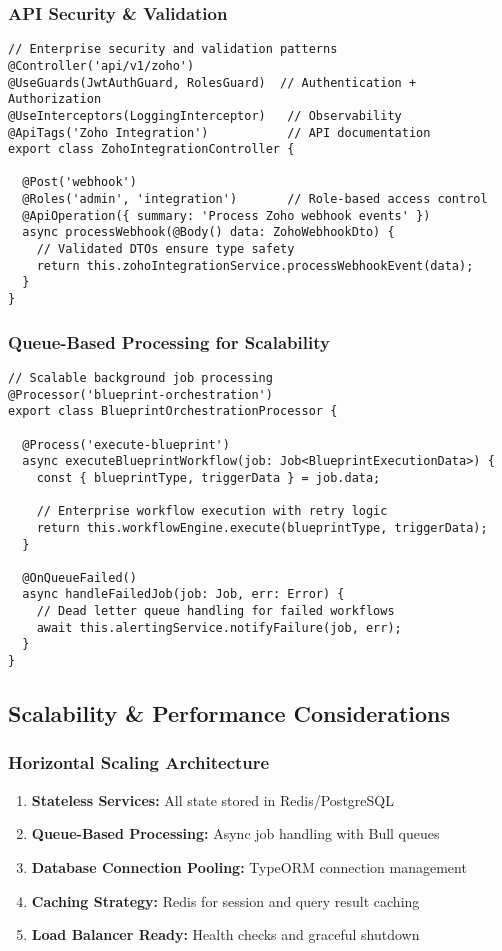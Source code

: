\subsubsection{API Security \& Validation}
\begin{verbatim}
// Enterprise security and validation patterns
@Controller('api/v1/zoho')
@UseGuards(JwtAuthGuard, RolesGuard)  // Authentication + Authorization
@UseInterceptors(LoggingInterceptor)   // Observability
@ApiTags('Zoho Integration')           // API documentation
export class ZohoIntegrationController {
  
  @Post('webhook')
  @Roles('admin', 'integration')       // Role-based access control
  @ApiOperation({ summary: 'Process Zoho webhook events' })
  async processWebhook(@Body() data: ZohoWebhookDto) {
    // Validated DTOs ensure type safety
    return this.zohoIntegrationService.processWebhookEvent(data);
  }
}
\end{verbatim}

\subsubsection{Queue-Based Processing for Scalability}
\begin{verbatim}
// Scalable background job processing
@Processor('blueprint-orchestration')
export class BlueprintOrchestrationProcessor {
  
  @Process('execute-blueprint')
  async executeBlueprintWorkflow(job: Job<BlueprintExecutionData>) {
    const { blueprintType, triggerData } = job.data;
    
    // Enterprise workflow execution with retry logic
    return this.workflowEngine.execute(blueprintType, triggerData);
  }
  
  @OnQueueFailed()
  async handleFailedJob(job: Job, err: Error) {
    // Dead letter queue handling for failed workflows
    await this.alertingService.notifyFailure(job, err);
  }
}
\end{verbatim}

\subsection{Scalability \& Performance Considerations}

\subsubsection{Horizontal Scaling Architecture}
\begin{enumerate}
\item \textbf{Stateless Services:} All state stored in Redis/PostgreSQL
\item \textbf{Queue-Based Processing:} Async job handling with Bull queues
\item \textbf{Database Connection Pooling:} TypeORM connection management
\item \textbf{Caching Strategy:} Redis for session and query result caching
\item \textbf{Load Balancer Ready:} Health checks and graceful shutdown
\end{enumerate}

